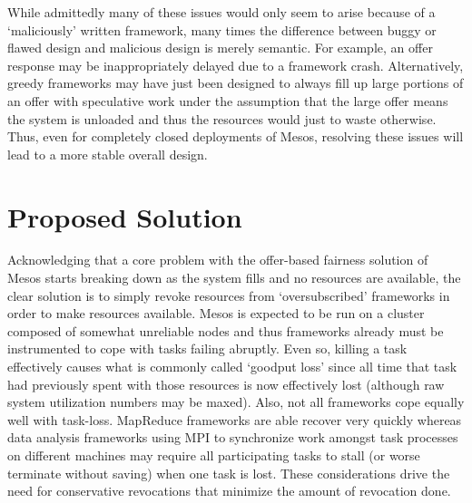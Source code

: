 While admittedly many of these issues would only seem to arise because of a `maliciously'
written framework, many times the difference between buggy or flawed design and malicious
design is merely semantic. For example, an offer response may be inappropriately delayed due to
a framework crash. Alternatively, greedy frameworks may have just been designed to always fill
up large portions of an offer with speculative work under the assumption that the large offer
means the system is unloaded and thus the resources would just to waste otherwise. Thus, even
for completely closed deployments of Mesos, resolving these issues will lead to a more stable
overall design. 

\section{Proposed Solution}
Acknowledging that a core problem with the offer-based fairness solution of Mesos starts
breaking down as the system fills and no resources are available, the clear solution is to
simply revoke resources from `oversubscribed' frameworks in order to make resources available.
Mesos is expected to be run on a cluster composed of somewhat unreliable nodes and thus
frameworks already must be instrumented to cope with tasks failing abruptly. Even so, killing a
task effectively causes what is commonly called `goodput loss' since all time that task had
previously spent with those resources is now effectively lost (although raw system utilization
numbers may be maxed). Also, not all frameworks cope equally well with task-loss. MapReduce
frameworks are able recover very quickly whereas data analysis frameworks using MPI to
synchronize work amongst task processes on different machines may require all participating
tasks to stall (or worse terminate without saving) when one task is lost. These considerations
drive the need for conservative revocations that minimize the amount of revocation done.

